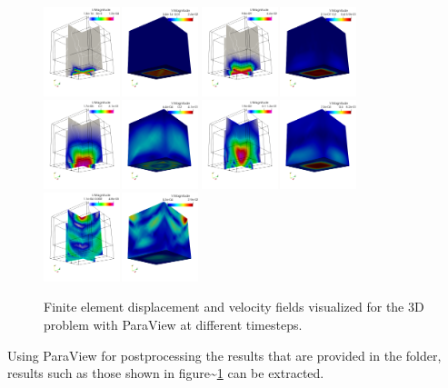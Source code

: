 \begin{figure}[h!]
\centering
\includegraphics[width=0.4\textwidth]{./Images/sd-3du0.png}
\includegraphics[width=0.4\textwidth]{./Images/sd-3du1.png}\\
\includegraphics[width=0.4\textwidth]{./Images/sd-3du2.png}
\includegraphics[width=0.4\textwidth]{./Images/sd-3du3.png}\\
\includegraphics[width=0.4\textwidth]{./Images/sd-3du4.png}
\caption{Finite element displacement and velocity fields visualized for the 3D problem with ParaView at different timesteps. \label{bar3d-sd}}
\end{figure}

Using ParaView for postprocessing the results that are provided in the
 folder, results such as those shown in
figure\textasciitilde{}\ref{bar3d-sd} can be extracted.
